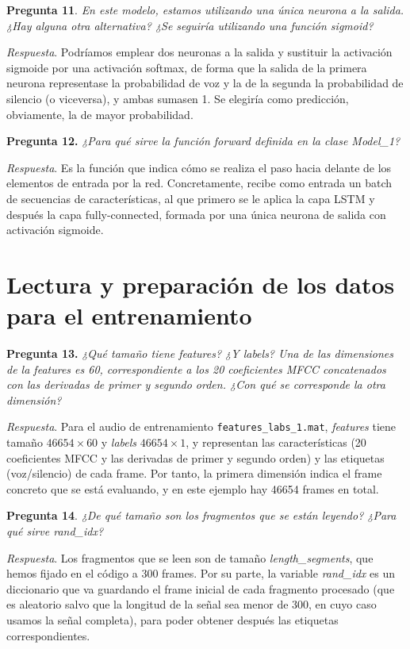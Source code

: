 \documentclass[11pt]{article}
\begin{document}
\textbf{Pregunta 11}. \textit{En este modelo, estamos utilizando una única neurona a la salida. ¿Hay alguna otra alternativa? ¿Se seguiría utilizando una función sigmoid?}

\textit{Respuesta}. Podríamos emplear dos neuronas a la salida y sustituir la activación sigmoide por una activación softmax, de forma que la salida de la primera neurona representase la probabilidad de voz y la de la segunda la probabilidad de silencio (o viceversa), y ambas sumasen 1. Se elegiría como predicción, obviamente, la de mayor probabilidad.

\textbf{Pregunta 12.} \textit{¿Para qué sirve la función forward definida en la clase Model\_1?}

\textit{Respuesta}. Es la función que indica cómo se realiza el paso hacia delante de los elementos de entrada por la red. Concretamente, recibe como entrada un batch de secuencias de características, al que primero se le aplica la capa LSTM y después la capa fully-connected, formada por una única neurona de salida con activación sigmoide.

\section{Lectura y preparación de los datos para el entrenamiento}

\textbf{Pregunta 13.} \textit{¿Qué tamaño tiene features? ¿Y labels? Una de las dimensiones de la features es 60, correspondiente a los 20 coeficientes MFCC concatenados con las derivadas de primer y segundo orden. ¿Con qué se corresponde la otra dimensión?}

\textit{Respuesta}. Para el audio de entrenamiento \texttt{features\_labs\_1.mat}, \textit{features} tiene tamaño $46654\times 60$ y \textit{labels} $46654\times 1$, y representan las características (20 coeficientes MFCC y las derivadas de primer y segundo orden) y las etiquetas (voz/silencio) de cada frame. Por tanto, la primera dimensión indica el frame concreto que se está evaluando, y en este ejemplo hay 46654 frames en total.

\textbf{Pregunta 14}. \textit{¿De qué tamaño son los fragmentos que se están leyendo? ¿Para qué sirve rand\_idx?}

\textit{Respuesta}. Los fragmentos que se leen son de tamaño \textit{length\_segments}, que hemos fijado en el código a 300 frames. Por su parte, la variable \textit{rand\_idx} es un diccionario que va guardando el frame inicial de cada fragmento procesado (que es aleatorio salvo que la longitud de la señal sea menor de 300, en cuyo caso usamos la señal completa), para poder obtener después las etiquetas correspondientes.
\end{document}
